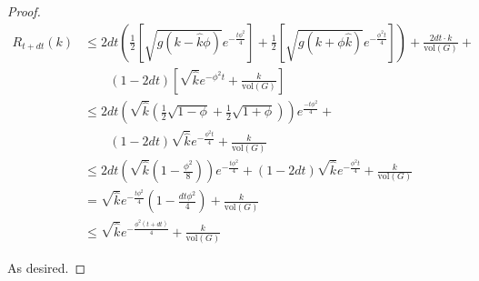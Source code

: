 \documentclass[../main.tex]{subfiles}
\begin{document}
\begin{proof}
    \begin{align}
        R_{t+dt}(k) & \leq 2dt \left(\frac{1}{2}\left[\sqrt{g(k - \hat{k}\phi)} e^{-\frac{t\phi^2}{4}}\right] + \frac{1}{2}\left[\sqrt{g(k + \phi\hat{k})} e^{-\frac{\phi^2 t}{4}}\right] \right) + \frac{2dt \cdot k}{\text{vol}(G)} + \nonumber \\ 
        &\qquad (1-2dt)\left[ \sqrt{\hat{k}}e^{-\phi^2 t} +\frac{k}{\text{vol}(G)} \right] \\
        & \leq 2dt \left(\sqrt{\hat{k}}\left(\frac{1}{2}\sqrt{1 - \phi} + \frac{1}{2}\sqrt{1+\phi}\right) \right) e^{\frac{-t\phi^2}{4}} + \nonumber \\ 
        &\qquad (1-2dt) \sqrt{\hat{k}}e^{-\frac{\phi^2 t}{4}} + \frac{k}{\text{vol}(G)} \\
        & \leq 2dt \left(\sqrt{\hat{k}}\left(1 - \frac{\phi^2}{8}\right)\right) e^{-\frac{t \phi^2}{4}} + (1-2dt) \sqrt{\hat{k}}e^{-\frac{\phi^2 t}{4}} + \frac{k}{\text{vol}(G)} \\
        & = \sqrt{\hat{k}} e^{-\frac{t\phi^2}{4}}\left(1 - \frac{dt\phi^2}{4}\right) + \frac{k}{\text{vol}(G)} \\
        & \leq \sqrt{\hat{k}} e^{-\frac{\phi^2 (t+dt)}{4}{}} + \frac{k}{\text{vol}(G)}
    \end{align}
    
    As desired.
\end{proof}
\end{document}
